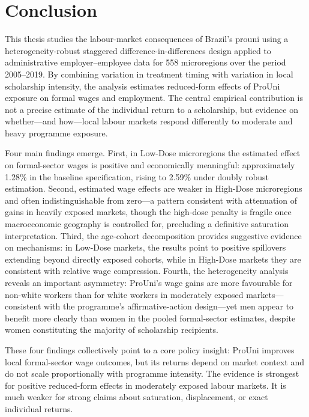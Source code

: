 \clearpage
\section{Conclusion}
\label{sec:conclusion}

This thesis studies the labour-market consequences of Brazil's \acrlong{prouni} using a heterogeneity-robust staggered difference-in-differences design applied to administrative employer--employee data for 558 microregions over the period 2005--2019. By combining variation in treatment timing with variation in local scholarship intensity, the analysis estimates reduced-form effects of ProUni exposure on formal wages and employment. The central empirical contribution is not a precise estimate of the individual return to a scholarship, but evidence on whether---and how---local labour markets respond differently to moderate and heavy programme exposure.

Four main findings emerge. First, in Low-Dose microregions the estimated effect on formal-sector wages is positive and economically meaningful: approximately 1.28\% in the baseline specification, rising to 2.59\% under doubly robust estimation. Second, estimated wage effects are weaker in High-Dose microregions and often indistinguishable from zero---a pattern consistent with attenuation of gains in heavily exposed markets, though the high-dose penalty is fragile once macroeconomic geography is controlled for, precluding a definitive saturation interpretation. Third, the age-cohort decomposition provides suggestive evidence on mechanisms: in Low-Dose markets, the results point to positive spillovers extending beyond directly exposed cohorts, while in High-Dose markets they are consistent with relative wage compression. Fourth, the heterogeneity analysis reveals an important asymmetry: ProUni's wage gains are more favourable for non-white workers than for white workers in moderately exposed markets---consistent with the programme's affirmative-action design---yet men appear to benefit more clearly than women in the pooled formal-sector estimates, despite women constituting the majority of scholarship recipients.

These four findings collectively point to a core policy insight: ProUni improves local formal-sector wage outcomes, but its returns depend on market context and do not scale proportionally with programme intensity. The evidence is strongest for positive reduced-form effects in moderately exposed labour markets. It is much weaker for strong claims about saturation, displacement, or exact individual returns.

